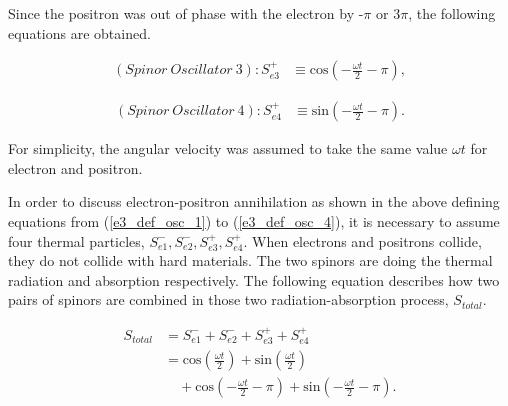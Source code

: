 \documentclass[%
 reprint,
 amsmath,amssymb,
 aps,
]{revtex4-1}
\numberwithin{equation}{section}%
\begin{document}
Since the positron was out of phase with the electron by -$\pi$ or 3$\pi$, the following equations are obtained.


        \begin{equation}
            \begin{split}
                (Spinor \ Oscillator \ 3): S_{e3}^{+} 
                    & \equiv \mathrm{cos} \left( - \frac{\omega t}{2} - \pi \right)
                    ,
                \label{e3_def_osc_3}
            \end{split}
        \end{equation}

        \begin{equation}
            \begin{split}
                (Spinor \ Oscillator \ 4): S_{e4}^{+}
                    & \equiv \mathrm{sin} \left( - \frac{\omega t}{2} - \pi \right)
                    .
                \label{e3_def_osc_4}
            \end{split}
        \end{equation}


For simplicity, the angular velocity was assumed to take the same value $\omega t$ for electron and positron.


In order to discuss electron-positron annihilation as shown in the above defining equations from (\ref{e3_def_osc_1}) to (\ref{e3_def_osc_4}), it is necessary to assume four thermal particles, $S_{e1}^{-}, S_{e2}^{-}, S_{e3}^{+}, S_{e4}^{+}$. When electrons and positrons collide, they do not collide with hard materials. The two spinors are doing the thermal radiation and absorption respectively. The following equation describes how two pairs of spinors are combined in those two radiation-absorption process, $S_{total}$. 


        \begin{equation}
            \begin{split}
                S_{total} 
                &= S_{e1}^{-} + S_{e2}^{-} + S_{e3}^{+} + S_{e4}^{+} \\
                &= \mathrm{cos} \left( \frac{\omega t}{2} \right) +  \mathrm{sin} \left( \frac{\omega t}{2} \right) \\
                &\quad + \mathrm{cos} \left( - \frac{\omega t}{2} - \pi \right) + \mathrm{sin} \left( - \frac{\omega t}{2} - \pi \right)
                .
                \label{e3_Osc_Total}
            \end{split}
        \end{equation}
\end{document}
